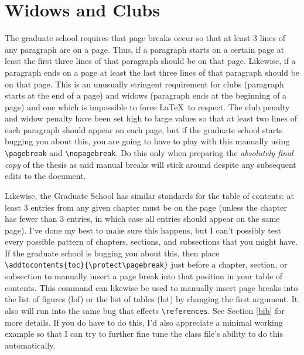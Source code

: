 \section{Widows and Clubs}
The graduate school requires that page breaks occur so that at least 3 lines of any paragraph are on a page.  Thus, if a paragraph starts on a certain page at least the first three lines of that paragraph should be on that page.  Likewise, if a paragraph ends on a page at least the last three lines of that paragraph should be on that page.  This is an unusually stringent requirement for clubs (paragraph starts at the end of a page) and widows (paragraph ends at the beginning of a page) and one which is impossible to force \LaTeX\ to respect.  The club penalty and widow penalty have been set high to large values so that at least two lines of each paragraph should appear on each page, but if the graduate school starts bugging you about this, you are going to have to play with this manually using \verb=\pagebreak= and \verb=\nopagebreak=.  Do this only when preparing the \textit{absolutely final copy} of the thesis as said manual breaks will stick around despite any subsequent edits to the document.

Likewise, the Graduate School has similar standards for the table of contents: at least 3 entries from any given chapter must be on the page (unless the chapter has fewer than 3 entries, in which case all entries should appear on the same page).  I've done my best to make sure this happens, but I can't possibly test every possible pattern of chapters, sections, and subsections that you might have.  If the graduate school is bugging you about this, then place \verb=\addtocontents{toc}{\protect\pagebreak}= just before a chapter, section, or subsection to manually insert a page break into that position in your table of contents.  This command can likewise be used to manually insert page breaks into the list of figures (lof) or the list of tables (lot) by changing the first argument.  It also will run into the same bug that effects \verb=\references=.  See Section \ref{bib} for more details.  If you do have to do this, I'd also appreciate a minimal working example so that I can try to further fine tune the class file's ability to do this automatically.

